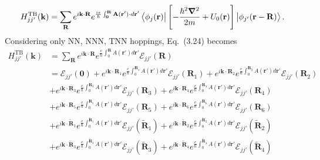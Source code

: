 \begin{gather}
	H_{jj'}^{\text{TB}}(\mathbf{k})
	= \sum_{\mathbf{R}} e^{i\mathbf{k \cdot R}}e^{\frac{ie}{\hbar} \int_{\mathbf{0}}^{\mathbf{R}} \mathbf{A(\mathbf{r'})} \cdot d \mathbf{r'} } \bra{\phi_{j}(\mathbf{r})} \left[ -\dfrac{\hbar^{2} \boldsymbol{\nabla}^{2}}{2m} + U_{0} (\mathbf{r}) \right] \ket{\phi_{j'}(\mathbf{r - R})}.
\end{gather}
Considering only \ac{NN}, \ac{NNN}, \ac{TNN} hoppings, Eq.~(3.24) becomes
\begin{equation}
	\begin{aligned}
		H_{jj'}^{\text{TB}}(\mathbf{k})
		& = \sum_{\mathbf{R}} e^{i\mathbf{k\cdot R}} e^{\frac{e}{\hbar}\int_{0}^{\mathbf{R}}A(\mathbf{r'})d\mathbf{r'}} \mathcal{E}_{jj'}(\mathbf{R})                                                                                                                                                                                                \\
		& = \mathcal{E}_{jj'}(\mathbf{0}) + e^{i\mathbf{k\cdot}\mathbf{R}_{1} }e^{\frac{e}{\hbar}\int_{0}^{\mathbf{R}_{1}}A(\mathbf{r'})d\mathbf{r'}} \mathcal{E}_{jj'}(\mathbf{R}_{1})  + e^{i\mathbf{k\cdot}\mathbf{R}_{2} }e^{\frac{e}{\hbar}\int_{0}^{\mathbf{R}_{2}}A(\mathbf{r'})d\mathbf{r'}} \mathcal{E}_{jj'}(\mathbf{R}_{2})               \\
		& + e^{i\mathbf{k\cdot}\mathbf{R}_{3} }e^{\frac{e}{\hbar}\int_{0}^{\mathbf{R}_{3}}A(\mathbf{r'})d\mathbf{r'}} \mathcal{E}_{jj'}(\mathbf{R}_{3})+ e^{i\mathbf{k\cdot}\mathbf{R}_{4} }e^{\frac{e}{\hbar}\int_{0}^{\mathbf{R}_{4}}A(\mathbf{r'})d\mathbf{r'}} \mathcal{E}_{jj'}(\mathbf{R}_{4})                                                 \\
		& + e^{i\mathbf{k\cdot}\mathbf{R}_{5} }e^{\frac{e}{\hbar}\int_{0}^{\mathbf{R}_{5}}A(\mathbf{r'})d\mathbf{r'}} \mathcal{E}_{jj'}(\mathbf{R}_{5})+ e^{i\mathbf{k\cdot}\mathbf{R}_{6} }e^{\frac{e}{\hbar}\int_{0}^{\mathbf{R}_{6}}A(\mathbf{r'})d\mathbf{r'}} \mathcal{E}_{jj'}(\mathbf{R}_{6})                                                 \\
		& + e^{i\mathbf{k\cdot}\tilde{\mathbf{R}}_{1} }e^{\frac{e}{\hbar}\int_{0}^{\tilde{\mathbf{R}}_{1}}A(\mathbf{r'})d\mathbf{r'}} \mathcal{E}_{jj'}(\tilde{\mathbf{R}}_{1})+ e^{i\mathbf{k\cdot}\tilde{\mathbf{R}}_{2} }e^{\frac{e}{\hbar}\int_{0}^{\tilde{\mathbf{R}}_{2}}A(\mathbf{r'})d\mathbf{r'}} \mathcal{E}_{jj'}(\tilde{\mathbf{R}}_{2}) \\
		& + e^{i\mathbf{k\cdot}\tilde{\mathbf{R}}_{3} }e^{\frac{e}{\hbar}\int_{0}^{\tilde{\mathbf{R}}_{3}}A(\mathbf{r'})d\mathbf{r'}} \mathcal{E}_{jj'}(\tilde{\mathbf{R}}_{3})+ e^{i\mathbf{k\cdot}\tilde{\mathbf{R}}_{4} }e^{\frac{e}{\hbar}\int_{0}^{\tilde{\mathbf{R}}_{4}}A(\mathbf{r'})d\mathbf{r'}} \mathcal{E}_{jj'}(\tilde{\mathbf{R}}_{4}) \\

\end{aligned}
\end{equation}
